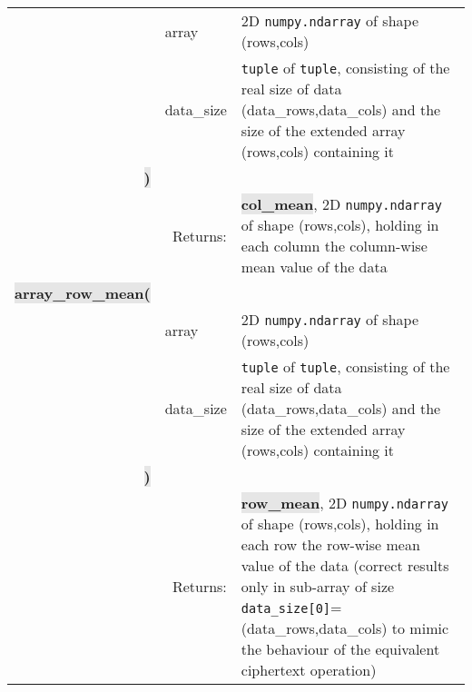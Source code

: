\documentclass[a4paper]{article}
\newcommand{\python}[1]{\texttt{#1}}
\newcommand{\pymethod}[1]{{\ttfamily\colorbox[HTML]{e6e6e6}{\color[HTML]{0066ba}\textbf{\small #1}}}}
\newcommand{\pyreturn}[1]{{\ttfamily\colorbox[HTML]{e6e6e6}{\color[HTML]{ba0066}\textbf{\small #1}}}}
\begin{document}
\begin{tabular}{r|p{3cm}|p{8cm}}
&array&2D \python{numpy.ndarray} of shape (rows,cols)\\
&data\_size&\python{tuple} of \python{tuple}, consisting of the real size of data (data\_rows,data\_cols) and the size of the extended array (rows,cols) containing it\\
\pymethod{)}&&\\
&\multicolumn{1}{r|}{Returns:}&\pyreturn{col\_mean}, 2D \python{numpy.ndarray} of shape (rows,cols), holding in each column the column-wise mean value of the data\\
\hline\pymethod{array\_row\_mean(}&&\\
&array&2D \python{numpy.ndarray} of shape (rows,cols)\\
&data\_size&\python{tuple} of \python{tuple}, consisting of the real size of data (data\_rows,data\_cols) and the size of the extended array (rows,cols) containing it\\
\pymethod{)}&&\\
&\multicolumn{1}{r|}{Returns:}&\pyreturn{row\_mean}, 2D \python{numpy.ndarray} of shape (rows,cols), holding in each row the row-wise mean value of the data (correct results only in sub-array of size \python{data_size[0]}=(data\_rows,data\_cols) to mimic the behaviour of the equivalent ciphertext operation)\\
\end{tabular}
\rmfamily
\end{document}
